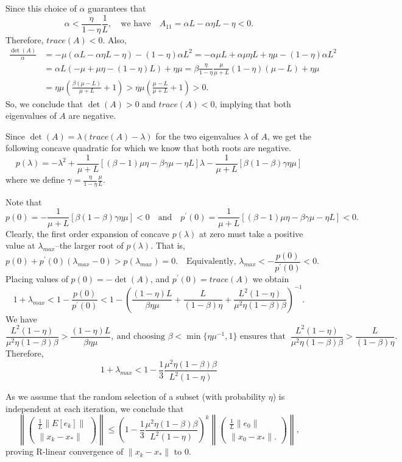 \documentclass{article}
\begin{document}
Since this choice of $\alpha$ guarantees that 
\[
 \alpha < \frac{\eta}{1-\eta}\frac{1}{L},  \quad \mbox{we have} \quad A_{11}=\alpha L-\alpha\eta L-\eta<0.
\]
Therefore, $trace(A)<0$.
Also,
\begin{align*}
 \frac{\det(A)}{\alpha} &= -\mu(\alpha L-\alpha\eta L-\eta)-(1-\eta)\alpha L^2 = -\alpha\mu L+\alpha\mu\eta L+\eta\mu-(1-\eta)\alpha L^2\\
 & =\alpha L(-\mu+\mu\eta-(1-\eta)L)+\eta\mu = \beta \displaystyle\frac{\eta}{1-\eta}\frac{\mu}{\mu+L}(1 -\eta)(\mu-L)+\eta\mu \\
 & = \eta\mu\left(\frac{\beta(\mu-L)}{\mu+L}+1\right) > \eta\mu\left(\frac{\mu-L}{\mu+L}+1\right)>0.
\end{align*}
So, we conclude that $\det(A)>0$ and $trace(A)<0$, implying that both eigenvalues of $A$ are negative.

Since $\det(A)=\lambda(trace(A)-\lambda)$ for the two eigenvalues $\lambda$ of $A$, we get the following concave quadratic for which we know that both roots are negative.
\[
 p(\lambda) = -\lambda^2 + \frac{1}{\mu+L}[(\beta-1)\mu\eta-\beta\gamma\mu-\eta L]\lambda - \frac{1}{\mu+L}[\beta(1-\beta)\gamma\eta\mu]
\]
where we define $\gamma = \frac{\eta}{1-\eta}\frac{\mu}{L}$.

Note that 
\[
 p(0)=-\frac{1}{\mu+L}[\beta(1-\beta)\gamma\eta\mu] < 0 \quad \mbox{and} \quad p^\prime(0) = \frac{1}{\mu+L}[(\beta-1)\mu\eta-\beta\gamma\mu-\eta L] < 0.
\]
Clearly, the first order expansion of concave $p(\lambda)$ at zero must take a positive value at $\lambda_{max}$--the larger root of $p(\lambda)$.  That is,
\[
 p(0)+p^\prime(0) (\lambda_{max}-0) > p(\lambda_{max})=0. \quad \mbox{Equivalently, } \lambda_{max}<-\frac{p(0)}{p^\prime(0)}<0.
\]
Placing values of $p(0)=-\det(A)$, and $p^\prime(0)=trace(A)$ we obtain
\[
 1+\lambda_{max}<1-\frac{p(0)}{p^\prime(0)}<1-\left(\frac{(1-\eta)L}{\beta\eta\mu}+\frac{L}{(1-\beta)\eta}+\frac{L^2(1-\eta)}{\mu^2\eta(1-\beta)\beta}\right)^{-1}.
\]
We have 
\[
\frac{L^2(1-\eta)}{\mu^2\eta(1-\beta)\beta} > \frac{(1-\eta)L}{\beta\eta\mu}, 
\ \mbox{and choosing $\beta<\min\{\eta\mu^{-1},1\}$ ensures that } \ \frac{L^2(1-\eta)}{\mu^2\eta(1-\beta)\beta}>\frac{L}{(1-\beta)\eta}.
\]
Therefore,
\[
 1+\lambda_{max}<1-\frac{1}{3}\frac{\mu^2\eta(1-\beta)\beta}{L^2(1-\eta)}
\]

\bigskip

As we assume that the random selection of a subset (with probability $\eta$) is independent at each iteration, we conclude that 
\[
 \left\|\begin{pmatrix} \displaystyle\frac{1}{L}\|E[e_k]\| \\
  \|x_k-x_\ast\|
 \end{pmatrix}\right\| \leq  \left(1-\frac{1}{3}\frac{\mu^2\eta(1-\beta)\beta}{L^2(1-\eta)}\right)^k               
  \left\|\begin{pmatrix} \displaystyle\frac{1}{L}\|e_0\| \\
  \|x_0-x_\ast\|.
 \end{pmatrix} \right\|,
\]
proving R-linear convergence of $\|x_k-x_\ast\|$ to 0.
\end{document}
